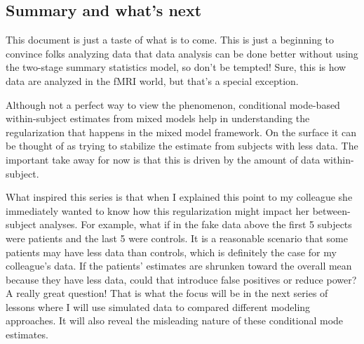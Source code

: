 \documentclass[]{book}
\begin{document}
\subsection{Summary and what's next}\label{summary-and-whats-next}

This document is just a taste of what is to come. This is just a
beginning to convince folks analyzing data that data analysis can be
done better without using the two-stage summary statistics model, so
don't be tempted! Sure, this is how data are analyzed in the fMRI world,
but that's a special exception.

Although not a perfect way to view the phenomenon, conditional
mode-based within-subject estimates from mixed models help in
understanding the regularization that happens in the mixed model
framework. On the surface it can be thought of as trying to stabilize
the estimate from subjects with less data. The important take away for
now is that this is driven by the amount of data within-subject.

What inspired this series is that when I explained this point to my
colleague she immediately wanted to know how this regularization might
impact her between-subject analyses. For example, what if in the fake
data above the first 5 subjects were patients and the last 5 were
controls. It is a reasonable scenario that some patients may have less
data than controls, which is definitely the case for my colleague's
data. If the patients' estimates are shrunken toward the overall mean
because they have less data, could that introduce false positives or
reduce power? A really great question! That is what the focus will be in
the next series of lessons where I will use simulated data to compared
different modeling approaches. It will also reveal the misleading nature
of these conditional mode estimates.
\end{document}
